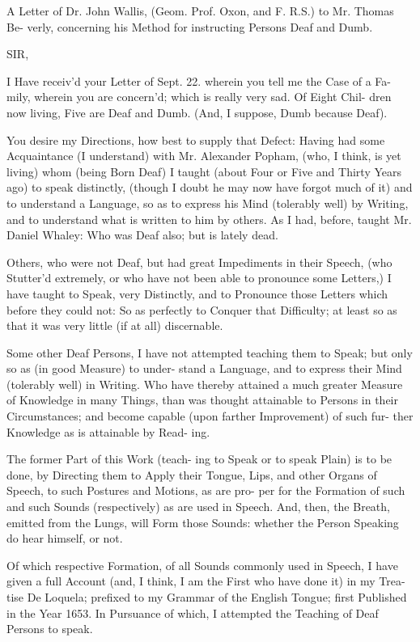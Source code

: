 A Letter of Dr. John Wallis,
(Geom. Prof. Oxon, and F.
R.S.) to Mr. Thomas Be-
verly, concerning his Method
for instructing Persons Deaf
and Dumb.

SIR,

I Have receiv'd your Letter of Sept. 22.
wherein you tell me the Case of a Fa-
mily, wherein you are concern'd;
which is really very sad. Of Eight Chil-
dren now living, Five are Deaf and Dumb.
(And, I suppose, Dumb because Deaf).

You desire my Directions, how best to
supply that Defect: Having had some
Acquaintance (I understand) with Mr.
Alexander Popham, (who, I think, is yet
living) whom (being Born Deaf) I taught
(about Four or Five and Thirty Years ago)
to speak distinctly, (though I doubt he
may now have forgot much of it) and to
understand a Language, so as to express
his Mind (tolerably well) by Writing,
and to understand what is written to him
by others. As I had, before, taught Mr.
Daniel Whaley: Who was Deaf also;
but is lately dead.

Others, who were not Deaf, but had
great Impediments in their Speech, (who
Stutter'd extremely, or who have not been
able to pronounce some Letters,) I have
taught to Speak, very Distinctly, and to
Pronounce those Letters which before they
could not: So as perfectly to Conquer
that Difficulty; at least so as that it was
very little (if at all) discernable.

Some other Deaf Persons, I have not
attempted teaching them to Speak; but
only so as (in good Measure) to under-
stand a Language, and to express their
Mind (tolerably well) in Writing. Who
have thereby attained a much greater
Measure of Knowledge in many Things,
than was thought attainable to Persons in
their Circumstances; and become capable
(upon farther Improvement) of such fur-
ther Knowledge as is attainable by Read-
ing.

The former Part of this Work (teach-
ing to Speak or to speak Plain) is to be
done, by Directing them to Apply their
Tongue, Lips, and other Organs of Speech,
to such Postures and Motions, as are pro-
per for the Formation of such and such
Sounds (respectively) as are used in Speech.
And, then, the Breath, emitted from the
Lungs, will Form those Sounds: whether
the Person Speaking do hear himself, or
not.

Of which respective Formation, of all
Sounds commonly used in Speech, I have
given a full Account (and, I think, I am
the First who have done it) in my Trea-
tise De Loquela; prefixed to my Grammar
of the English Tongue; first Published in
the Year 1653. In Pursuance of which,
I attempted the Teaching of Deaf Persons
to speak.


